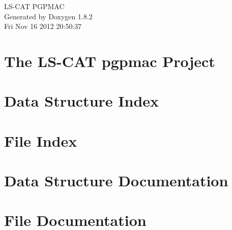 \documentclass{book}
\begin{document}
\hypersetup{pageanchor=false,citecolor=blue}
\begin{titlepage}
\vspace*{7cm}
\begin{center}
{\Large L\-S-\/\-C\-A\-T P\-G\-P\-M\-A\-C }\\
\vspace*{1cm}
{\large Generated by Doxygen 1.8.2}\\
\vspace*{0.5cm}
{\small Fri Nov 16 2012 20:50:37}\\
\end{center}
\end{titlepage}
\clearemptydoublepage
{}
\tableofcontents
\clearemptydoublepage
{}
\hypersetup{pageanchor=true,citecolor=blue}
\chapter{The L\-S-\/\-C\-A\-T pgpmac Project}
\label{index}\hypertarget{index}{}
\chapter{Data Structure Index}

\chapter{File Index}

\chapter{Data Structure Documentation}


















\chapter{File Documentation}










\printindex
\end{document}
